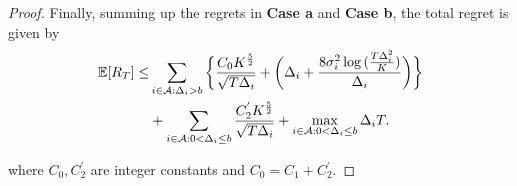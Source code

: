 \begin{proof}
Finally, summing up the regrets in \textbf{Case a} and \textbf{Case b}, the total regret is given by
\begin{align*}
\mathbb{E} [R_{T}] \leq &\sum\limits_{i\in \mathcal{A} :\Delta_{i} > b}\bigg\lbrace \dfrac{C_0 K^{\frac{5}{2}}}{\sqrt{T\Delta_i}} + \bigg(\Delta_{i}+\dfrac{8\sigma_i^2\log{(\frac{T\Delta_{i}^{2}}{K})}}{\Delta_{i}}\bigg)\bigg \rbrace\\ 
  & +\sum\limits_{i\in \mathcal{A} :0 < \Delta_{i}\leq b} \dfrac{C_2^{'} K^{\frac{5}{2}}}{\sqrt{T\Delta_i}} + \max_{i\in \mathcal{A} :0 < \Delta_{i}\leq b}\Delta_{i}T.
\end{align*}

where $C_0, C_2^{'}$ are integer constants and $C_0=C_1 + C_2^{'}$.
\end{proof}


